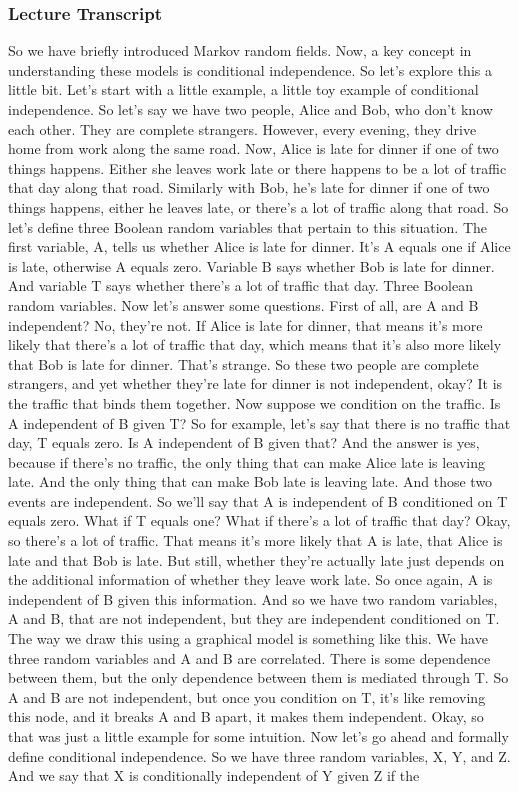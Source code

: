 \documentclass{article}
\begin{document}
\subsubsection*{Lecture Transcript}
\begin{flushleft}
    So we have briefly introduced Markov random fields. Now, a key concept in understanding these models is conditional independence. So let's explore this a little bit. Let's start with a little example, a little toy example of conditional independence. So let's say we have two people, Alice and Bob, who don't know each other. They are complete strangers. However, every evening, they drive home from work along the same road. Now, Alice is late for dinner if one of two things happens. Either she leaves work late or there happens to be a lot of traffic that day along that road. Similarly with Bob, he's late for dinner if one of two things happens, either he leaves late, or there's a lot of traffic along that road. So let's define three Boolean random variables that pertain to this situation. The first variable, A, tells us whether Alice is late for dinner. It's A equals one if Alice is late, otherwise A equals zero. Variable B says whether Bob is late for dinner. And variable T says whether there's a lot of traffic that day. Three Boolean random variables. Now let's answer some questions. First of all, are A and B independent? No, they're not. If Alice is late for dinner, that means it's more likely that there's a lot of traffic that day, which means that it's also more likely that Bob is late for dinner. That's strange. So these two people are complete strangers, and yet whether they're late for dinner is not independent, okay? It is the traffic that binds them together. Now suppose we condition on the traffic. Is A independent of B given T? So for example, let's say that there is no traffic that day, T equals zero. Is A independent of B given that? And the answer is yes, because if there's no traffic, the only thing that can make Alice late is leaving late. And the only thing that can make Bob late is leaving late. And those two events are independent. So we'll say that A is independent of B conditioned on T equals zero. What if T equals one? What if there's a lot of traffic that day? Okay, so there's a lot of traffic. That means it's more likely that A is late, that Alice is late and that Bob is late. But still, whether they're actually late just depends on the additional information of whether they leave work late. So once again, A is independent of B given this information. And so we have two random variables, A and B, that are not independent, but they are independent conditioned on T. The way we draw this using a graphical model is something like this. We have three random variables and A and B are correlated. There is some dependence between them, but the only dependence between them is mediated through T. So A and B are not independent, but once you condition on T, it's like removing this node, and it breaks A and B apart, it makes them independent. Okay, so that was just a little example for some intuition. Now let's go ahead and formally define conditional independence. So we have three random variables, X, Y, and Z. And we say that X is conditionally independent of Y given Z if the 
\end{flushleft}
\end{document}
